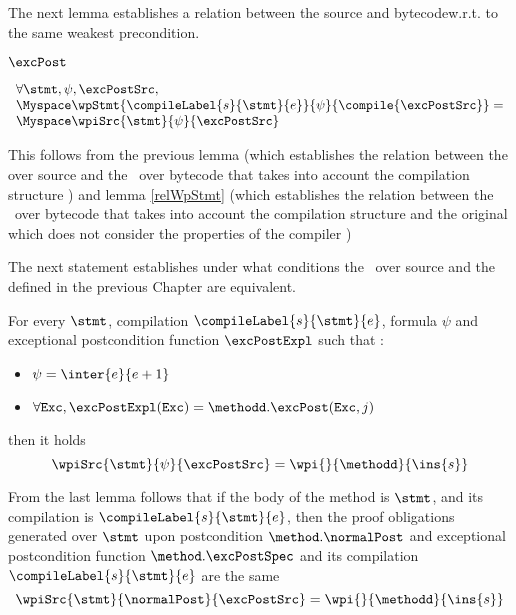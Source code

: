 






The next lemma establishes  a relation between the source and bytecode\wpName w.r.t. to the same weakest precondition. 

$\excPost $ 
\begin{wpStmtBcSrc1} \label{wpStmtBcSrc1}
 
$$ 
    \begin{array}{l}
    \forall \stmt, \psi, \excPostSrc , \\
       \Myspace  \wpStmt{\compileLabel{s}{\stmt}{e}}{ \psi }{ \compile{\excPostSrc} }  = \\
       \Myspace   \wpiSrc{\stmt  }{\psi }{ \excPostSrc }  
	 
    \end{array}
 $$
\end{wpStmtBcSrc1}

This follows from the previous lemma (which establishes the relation between the \wpName over source and the \wpName \ over bytecode that takes into account the compilation structure  )
and lemma \ref{relWpStmt} (which establishes the relation between the \wpName \ over bytecode that takes into account the compilation structure  and the original \wpName which does 
not consider the properties of the compiler )


The next statement establishes under what conditions
 the \wpName \  over source and the \wpName defined in the previous Chapter are equivalent.
 
\begin{wpStmtBcSrc2} \label{wpStmtBcSrc2}
For every $\stmt$, compilation $\compileLabel{s}{\stmt}{e}$,  formula $\psi$ and 
   exceptional postcondition  function $\excPostExpl $ such that :
 
  \begin{itemize}
         \item $\psi = \inter{e}{e+1}$
	 \item$\forall \mbox{\rm\texttt{Exc}} ,  \excPostExpl( \mbox{\rm\texttt{Exc}} ) = \methodd.\excPost(\mbox{\rm\texttt{Exc}}, j ) $ 
  \end{itemize}
      then it holds 
$$ \wpiSrc{\stmt}{\psi }{\excPostSrc }  = \wpi{}{\methodd}{\ins{s} }$$
\end{wpStmtBcSrc2}


From the last lemma follows that if the body of the  method \methodd is $\stmt$, and its compilation is $\compileLabel{s}{\stmt}{e}$, then 
the proof obligations generated over $\stmt$ upon postcondition $\method.\normalPost$ and exceptional
postcondition function  $\method.\excPostSpec$     and its compilation $\compileLabel{s}{\stmt}{e}$ are the same 
$$ \wpiSrc{\stmt}{\normalPost }{\excPostSrc }  = \wpi{}{\methodd}{\ins{s} }$$
